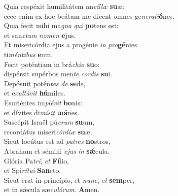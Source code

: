 \oddverse Quia respéxit humilitátem an\textit{cíl}\textit{læ} \textbf{su}æ:~\*\\
\oddverse ecce enim ex hoc beátam me dicent omnes ge\textit{ne}\textit{ra}\textit{ti}\textbf{ó}nes.\\
\evenverse Quia fecit mihi ma\textit{gna} \textit{qui} \textbf{po}tens est:~\*\\
\evenverse et san\textit{ctum} \textit{no}\textit{men} \textbf{e}jus.\\
\oddverse Et misericórdia ejus a progénie \textit{in} \textit{pro}\textbf{gé}nies~\*\\
\oddverse ti\textit{mén}\textit{ti}\textit{bus} \textbf{e}um.\\
\evenverse Fecit poténtiam in brá\textit{chi}\textit{o} \textbf{su}o:~\*\\
\evenverse dispérsit supérbos men\textit{te} \textit{cor}\textit{dis} \textbf{su}i.\\
\oddverse Depósuit potén\textit{tes} \textit{de} \textbf{se}de,~\*\\
\oddverse et e\textit{xal}\textit{tá}\textit{vit} \textbf{hú}miles.\\
\evenverse Esuriéntes im\textit{plé}\textit{vit} \textbf{bo}nis:~\*\\
\evenverse et dívites di\textit{mí}\textit{sit} \textit{i}\textbf{ná}nes.\\
\oddverse Suscépit Israël pú\textit{e}\textit{rum} \textbf{su}um,~\*\\
\oddverse recordátus miseri\textit{cór}\textit{di}\textit{æ} \textbf{su}æ.\\
\evenverse Sicut locútus est ad \textit{pa}\textit{tres} \textbf{no}stros,~\*\\
\evenverse Abraham et sémini \textit{e}\textit{jus} \textit{in} \textbf{sǽ}cula.\\
\oddverse Glória Pa\textit{tri}, \textit{et} \textbf{Fí}lio,~\*\\
\oddverse et Spi\textit{rí}\textit{tu}\textit{i} \textbf{San}cto.\\
\evenverse Sicut erat in princípio, et \textit{nunc}, \textit{et} \textbf{sem}per,~\*\\
\evenverse et in sǽcula sæ\textit{cu}\textit{ló}\textit{rum}. \textbf{A}men.\\
